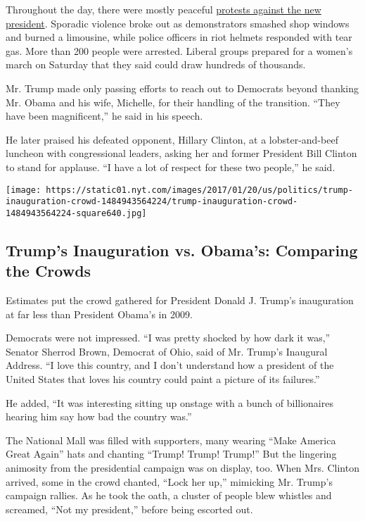 Throughout the day, there were mostly peaceful
\href{https://www.nytimes.com/2017/01/20/us/politics/inauguration-protests.html}{protests
against the new president}. Sporadic violence broke out as demonstrators
smashed shop windows and burned a limousine, while police officers in
riot helmets responded with tear gas. More than 200 people were
arrested. Liberal groups prepared for a women's march on Saturday that
they said could draw hundreds of thousands.

Mr. Trump made only passing efforts to reach out to Democrats beyond
thanking Mr. Obama and his wife, Michelle, for their handling of the
transition. ``They have been magnificent,'' he said in his speech.

He later praised his defeated opponent, Hillary Clinton, at a
lobster-and-beef luncheon with congressional leaders, asking her and
former President Bill Clinton to stand for applause. ``I have a lot of
respect for these two people,'' he said.

\href{https://www.nytimes.com/interactive/2017/01/20/us/politics/trump-inauguration-crowd.html}{}

\texttt{[image: https://static01.nyt.com/images/2017/01/20/us/politics/trump-inauguration-crowd-1484943564224/trump-inauguration-crowd-1484943564224-square640.jpg]}

\hypertarget{trumps-inauguration-vs-obamas-comparing-the-crowds}{%
\subsection{Trump's Inauguration vs. Obama's: Comparing the
Crowds}\label{trumps-inauguration-vs-obamas-comparing-the-crowds}}

Estimates put the crowd gathered for President Donald J. Trump's
inauguration at far less than President Obama's in 2009.

Democrats were not impressed. ``I was pretty shocked by how dark it
was,'' Senator Sherrod Brown, Democrat of Ohio, said of Mr. Trump's
Inaugural Address. ``I love this country, and I don't understand how a
president of the United States that loves his country could paint a
picture of its failures.''

He added, ``It was interesting sitting up onstage with a bunch of
billionaires hearing him say how bad the country was.''

The National Mall was filled with supporters, many wearing ``Make
America Great Again'' hats and chanting ``Trump! Trump! Trump!'' But the
lingering animosity from the presidential campaign was on display, too.
When Mrs. Clinton arrived, some in the crowd chanted, ``Lock her up,''
mimicking Mr. Trump's campaign rallies. As he took the oath, a cluster
of people blew whistles and screamed, ``Not my president,'' before being
escorted out.

